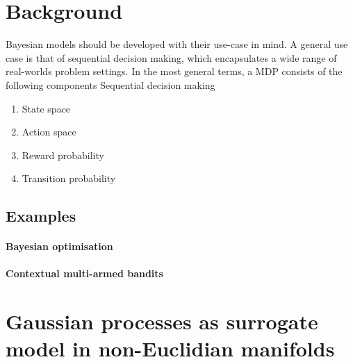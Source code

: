 
\section{Background}

Bayesian models should be developed with their use-case in mind. A general use case is that of sequential decision making, which encapsulates a wide range of real-worlds problem settings. In the most general terms, a MDP consists of the following components 
Sequential decision making
\begin{enumerate}
    \item State space
    \item Action space
    \item Reward probability
    \item Transition probability
\end{enumerate}

\subsection{Examples}
\paragraph{Bayesian optimisation}
\paragraph{Contextual multi-armed bandits}


\section{Gaussian processes as surrogate model in non-Euclidian manifolds}


